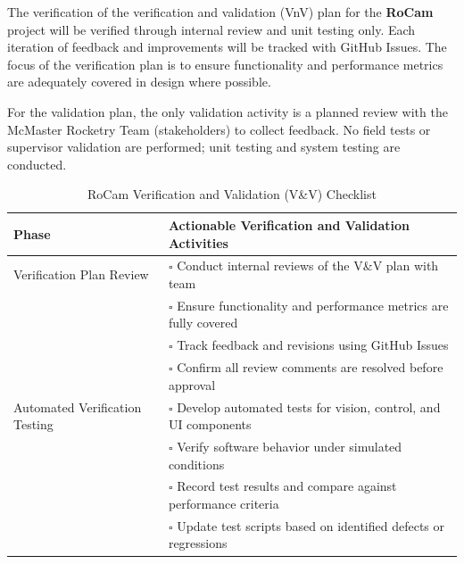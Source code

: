 \documentclass[12pt, titlepage]{article}
\begin{document}
The verification of the verification and validation (VnV) plan for the
\textbf{RoCam} project will be verified through internal review and unit
testing only. Each iteration of feedback and improvements will be tracked with
GitHub Issues. The focus of the verification plan is to ensure functionality
and performance metrics are adequately covered in design where possible.

For the validation plan, the only validation activity is a planned review with
the McMaster Rocketry Team (stakeholders) to collect feedback. No field tests
or supervisor validation are performed; unit testing and system testing are
conducted.


\begin{table}[H]
  \centering
  \caption{RoCam Verification and Validation (V\&V) Checklist}
  \label{tab:rocam_vnv_checklist}
  \renewcommand{\arraystretch}{1.3}
  \setlength{\tabcolsep}{8pt}
  \begin{tabular}{|p{4.4cm}|p{10.1cm}|}
    \hline
    \textbf{Phase}                 & \textbf{Actionable Verification and Validation Activities}                               \\ \hline

    Verification Plan Review       & $\square$ \; Conduct internal reviews of the V\&V
    plan with team                                                                                                            \\[-2pt]
                                   & $\square$ \; Ensure functionality and performance metrics are fully covered              \\[-2pt]
                                   & $\square$ \; Track feedback and revisions using GitHub Issues                            \\[-2pt]
                                   & $\square$ \; Confirm all review comments are resolved before approval                    \\ \hline

    Automated Verification Testing & $\square$ \; Develop automated tests for
    vision, control, and UI components                                                                                        \\[-2pt]
                                   & $\square$ \; Verify software behavior under simulated conditions                         \\[-2pt]
                                   & $\square$ \; Record test results and compare against performance criteria                \\[-2pt]
                                   & $\square$ \; Update test scripts based on identified defects or regressions              \\ \hline


\end{tabular}
\end{table}
\end{document}
